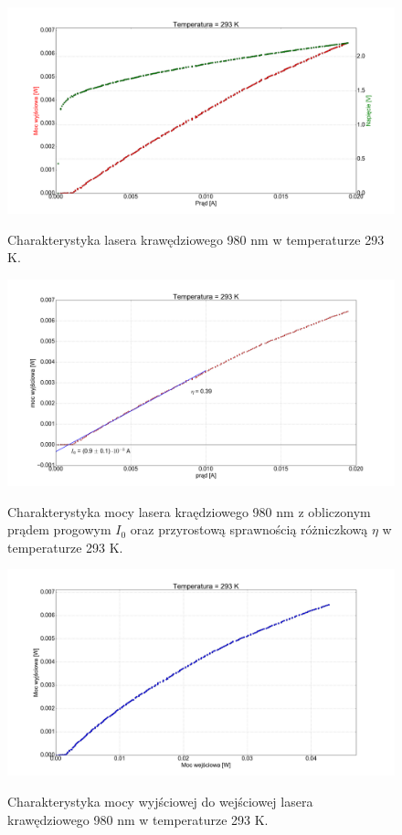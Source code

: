 \documentclass[a4paper, portrait,12pt]{report}
\begin{document}
\begin{figure}
\center
  \includegraphics[scale=0.30]{plot980/temp_20_IVL.png}
  \label{rys1}
  \caption{Charakterystyka lasera krawędziowego 980 nm w temperaturze 293 K.} 
\end{figure}


\begin{figure}
\center
  \includegraphics[scale=0.30]{plot980/temp_20_fit.png}
  \label{rys1}
  \caption{Charakterystyka mocy lasera kraędziowego 980 nm z obliczonym prądem progowym $I_0$ oraz przyrostową sprawnością różniczkową $\eta$ w temperaturze 293 K.} 
\end{figure}

\begin{figure}
\center
  \includegraphics[scale=0.30]{plot980/temp_20_power.png}
  \label{rys1}
  \caption{Charakterystyka mocy wyjściowej do wejściowej lasera krawędziowego 980 nm w temperaturze 293 K.} 
\end{figure}
\end{document}
